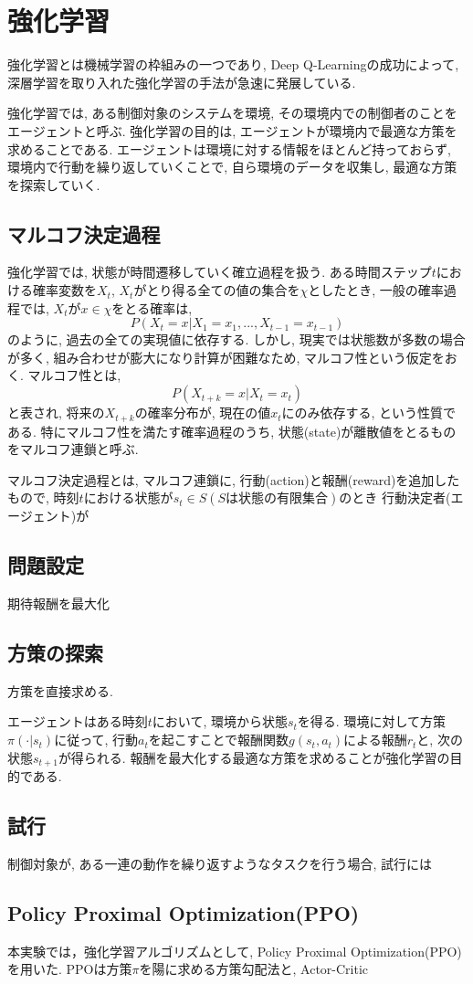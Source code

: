 \documentclass[../main]{subfiles}
\begin{document}
\newpage
\chapter{強化学習}
\label{chap:RL}
強化学習とは機械学習の枠組みの一つであり, 
Deep Q-Learning\cite{ref:dqn}の成功によって, 
深層学習を取り入れた強化学習の手法が急速に発展している.

強化学習では, ある制御対象のシステムを環境, 
その環境内での制御者のことをエージェントと呼ぶ.
強化学習の目的は, エージェントが環境内で最適な方策を求めることである.
エージェントは環境に対する情報をほとんど持っておらず, 
環境内で行動を繰り返していくことで, 
自ら環境のデータを収集し, 最適な方策を探索していく.

\section{マルコフ決定過程}
強化学習では, 状態が時間遷移していく確立過程を扱う.
ある時間ステップ$t$における確率変数を$X_t$, 
$X_t$がとり得る全ての値の集合を$\chi$としたとき, 
一般の確率過程では, $X_t$が$x\in\chi$をとる確率は, 
$$
P(X_t=x|X_1=x_1, ... ,X_{t-1}=x_{t-1})
$$
のように, 過去の全ての実現値に依存する.
しかし, 現実では状態数が多数の場合が多く, 
組み合わせが膨大になり計算が困難なため, 
マルコフ性という仮定をおく.
マルコフ性とは,
$$P(X_{t+k}=x|X_t=x_t)$$
と表され, 将来の$X_{t+k}$の確率分布が, 
現在の値$x_t$にのみ依存する, という性質である.
特にマルコフ性を満たす確率過程のうち, 
状態(state)が離散値をとるものをマルコフ連鎖と呼ぶ.

マルコフ決定過程とは, マルコフ連鎖に, 
行動(action)と報酬(reward)を追加したもので, 
時刻$t$における状態が$s_t\in S(Sは状態の有限集合)$のとき
行動決定者(エージェント)が


\section{問題設定}
期待報酬を最大化

\section{方策の探索}
方策を直接求める.

エージェントはある時刻$t$において, 環境から状態$s_t$を得る.
環境に対して方策$\pi(\cdot|s_t)$に従って, 
行動$a_t$を起こすことで報酬関数$g(s_t,a_t)$による報酬$r_t$と, 
次の状態$s_{t+1}$が得られる. 
報酬を最大化する最適な方策を求めることが強化学習の目的である.


\section{試行}
制御対象が, ある一連の動作を繰り返すようなタスクを行う場合, 
試行には


\section{Policy Proximal Optimization(PPO)}
本実験では，強化学習アルゴリズムとして, 
Policy Proximal Optimization(PPO)\cite{ref:proximal_policy}を用いた.
PPOは方策$\pi$を陽に求める方策勾配法と, Actor-Critic
\end{document}
